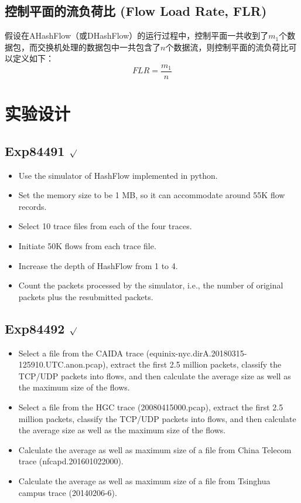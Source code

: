 \documentclass{article}
\begin{document}
\subsection{控制平面的流负荷比 (Flow Load Rate, FLR)}
假设在AHashFlow（或DHashFlow）的运行过程中，控制平面一共收到了$m_1$个数据包，而交换机处理的数据包中一共包含了$n$个数据流，则控制平面的流负荷比可以定义如下：
$$
FLR = \frac{m_1}{n}
$$

\section{实验设计}
\subsection{Exp84491 $\surd$}
\begin{itemize}
	\item Use the simulator of HashFlow implemented in python.
	\item Set the memory size to be 1 MB, so it can accommodate around 55K flow records.
	\item Select 10 trace files from each of the four traces.
	\item Initiate 50K flows from each trace file.
	\item Increase the depth of HashFlow from 1 to 4. 
	\item Count the packets processed by the simulator, i.e., the number of original packets plus the resubmitted packets.
\end{itemize}

\subsection{Exp84492 $\surd$}
\begin{itemize}
	\item Select a file from the CAIDA trace (equinix-nyc.dirA.20180315-125910.UTC.anon.pcap), extract the first 2.5 million packets, classify the TCP/UDP packets into flows, and then calculate the average size as well as the maximum size of the flows.
	\item Select a file from the HGC trace (20080415000.pcap), extract the first 2.5 million packets, classify the TCP/UDP packets into flows, and then calculate the average size as well as the maximum size of the flows.
	\item Calculate the average as well as maximum size of a file from China Telecom trace (nfcapd.201601022000).
	\item Calculate the average as well as maximum size of a file from Tsinghua campus trace (20140206-6). 
\end{itemize}
\end{document}
